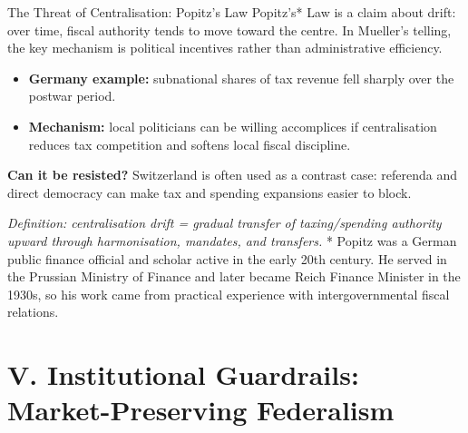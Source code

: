 \documentclass[10pt]{beamer}
\begin{document}
\begin{frame}{The Threat of Centralisation: Popitz's Law}
Popitz’s* Law is a claim about drift: over time, fiscal authority tends to move toward the centre.
In Mueller’s telling, the key mechanism is political incentives rather than administrative efficiency.

\begin{itemize}
\item \textbf{Germany example:} subnational shares of tax revenue fell sharply over the postwar period.
\item \textbf{Mechanism:} local politicians can be willing accomplices if centralisation reduces tax competition and softens local fiscal discipline.
\end{itemize}

\vspace{0.1cm}
\textbf{Can it be resisted?} Switzerland is often used as a contrast case: referenda and direct democracy can make tax and spending expansions easier to block.


\vspace{0.1cm}
\footnotesize
\textit{Definition: centralisation drift = gradual transfer of taxing/spending authority upward through harmonisation, mandates, and transfers.}
* Popitz was a German public finance official and scholar active in the early 20th century. He served in the Prussian Ministry of Finance and later became Reich Finance Minister in the 1930s, so his work came from practical experience with intergovernmental fiscal relations.
\end{frame}


\section{V. Institutional Guardrails: Market-Preserving Federalism}
\end{document}
